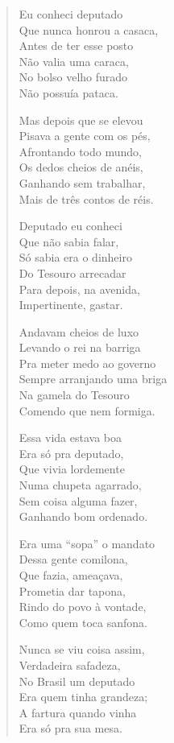 \begin{verse}
Eu conheci deputado\\
Que nunca honrou a casaca,\\
Antes de ter esse posto\\
Não valia uma caraca,\\
No bolso velho furado\\
Não possuía pataca.

Mas depois que se elevou\\
Pisava a gente com os pés, \\
Afrontando todo mundo,\\
Os dedos cheios de anéis,\\
Ganhando sem trabalhar,\\
Mais de três contos de réis.

Deputado eu conheci\\
Que não sabia falar,\\
Só sabia era o dinheiro\\
Do Tesouro arrecadar\\
Para depois, na avenida,\\
Impertinente, gastar.


Andavam cheios de luxo\\
Levando o rei na barriga\\
Pra meter medo ao governo\\
Sempre arranjando uma briga\\
Na gamela do Tesouro\\
Comendo que nem formiga.

Essa vida estava boa\\
Era só pra deputado,\\
Que vivia lordemente\\
Numa chupeta agarrado,\\
Sem coisa alguma fazer,\\
Ganhando bom ordenado.

Era uma “sopa” o mandato\\
Dessa gente comilona,\\
Que fazia, ameaçava,\\
Prometia dar tapona,\\
Rindo do povo à vontade,\\
Como quem toca sanfona.

Nunca se viu coisa assim,\\
Verdadeira safadeza,\\
No Brasil um deputado\\
Era quem tinha grandeza;\\
A fartura quando vinha\\
Era só pra sua mesa.



\end{verse}

